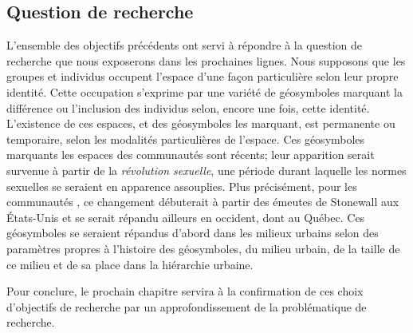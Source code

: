 \subsection*{Question de recherche} %
\label{sub:hypothese}
L'ensemble des objectifs précédents ont servi à répondre à la question de recherche que nous exposerons dans les prochaines lignes.
Nous supposons que les groupes et individus \lgbt{} occupent l'espace d'une façon particulière selon leur propre identité.
Cette occupation s'exprime par une variété de géosymboles marquant la différence ou l'inclusion des individus selon, encore une fois, cette identité.
L'existence de ces espaces, et des géosymboles les marquant, est permanente ou temporaire, selon les modalités particulières de l'espace.
Ces géosymboles marquants les espaces des communautés \lgbt sont récents; leur apparition serait survenue à partir de la \emph{révolution sexuelle}, une période durant laquelle les normes sexuelles se seraient en apparence assouplies.
Plus précisément, pour les communautés \lgbt{}, ce changement débuterait à partir des émeutes de Stonewall aux États-Unis et se serait répandu ailleurs en occident, dont au Québec.
Ces géosymboles se seraient répandus d'abord dans les milieux urbains selon des paramètres propres à l'histoire des géosymboles, du milieu urbain, de la taille de ce milieu et de sa place dans la hiérarchie urbaine.

Pour conclure, le prochain chapitre servira à la confirmation de ces choix d'objectifs de recherche par un approfondissement de la problématique de recherche.

